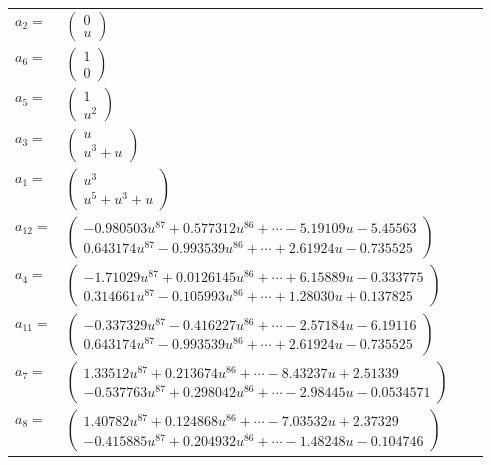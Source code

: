 \documentclass[1p]{elsarticle_modified}
\theoremstyle{definition}
\begin{document}
\begin{tabular}{m{7pt} m{180pt} m{7pt} m{180pt} }
\flushright $a_{2}=$&$\begin{pmatrix}0\\u\end{pmatrix}$ \\
\flushright $a_{6}=$&$\begin{pmatrix}1\\0\end{pmatrix}$ \\
\flushright $a_{5}=$&$\begin{pmatrix}1\\u^2\end{pmatrix}$ \\
\flushright $a_{3}=$&$\begin{pmatrix}u\\u^3+u\end{pmatrix}$ \\
\flushright $a_{1}=$&$\begin{pmatrix}u^3\\u^5+u^3+u\end{pmatrix}$ \\
\flushright $a_{12}=$&$\begin{pmatrix}-0.980503 u^{87}+0.577312 u^{86}+\cdots-5.19109 u-5.45563\\0.643174 u^{87}-0.993539 u^{86}+\cdots+2.61924 u-0.735525\end{pmatrix}$ \\
\flushright $a_{4}=$&$\begin{pmatrix}-1.71029 u^{87}+0.0126145 u^{86}+\cdots+6.15889 u-0.333775\\0.314661 u^{87}-0.105993 u^{86}+\cdots+1.28030 u+0.137825\end{pmatrix}$ \\
\flushright $a_{11}=$&$\begin{pmatrix}-0.337329 u^{87}-0.416227 u^{86}+\cdots-2.57184 u-6.19116\\0.643174 u^{87}-0.993539 u^{86}+\cdots+2.61924 u-0.735525\end{pmatrix}$ \\
\flushright $a_{7}=$&$\begin{pmatrix}1.33512 u^{87}+0.213674 u^{86}+\cdots-8.43237 u+2.51339\\-0.537763 u^{87}+0.298042 u^{86}+\cdots-2.98445 u-0.0534571\end{pmatrix}$ \\
\flushright $a_{8}=$&$\begin{pmatrix}1.40782 u^{87}+0.124868 u^{86}+\cdots-7.03532 u+2.37329\\-0.415885 u^{87}+0.204932 u^{86}+\cdots-1.48248 u-0.104746\end{pmatrix}$ \\

\end{tabular}
\end{document}

